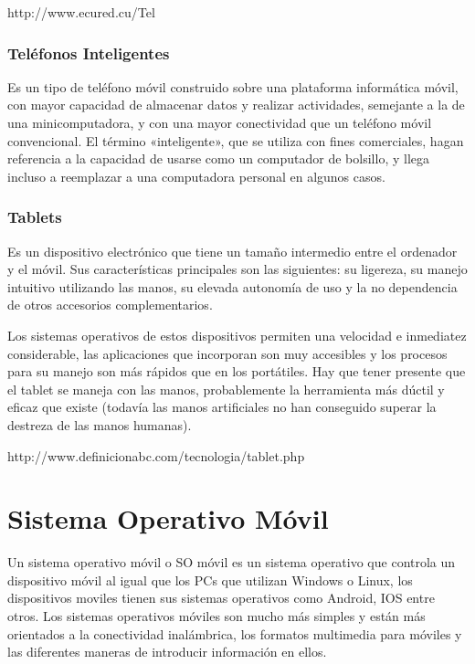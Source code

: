 http://www.ecured.cu/Tel%

\subsubsection{Teléfonos Inteligentes}

Es un tipo de teléfono móvil construido sobre una plataforma informática móvil, con mayor capacidad de almacenar datos y realizar actividades, semejante a la de una minicomputadora, y con una mayor conectividad que un teléfono móvil convencional. El término «inteligente», que se utiliza con fines comerciales, hagan referencia a la capacidad de usarse como un computador de bolsillo, y llega incluso a reemplazar a una computadora personal en algunos casos.

\subsubsection{Tablets}

Es un dispositivo electrónico que tiene un tamaño intermedio entre el ordenador y el móvil. Sus características principales son las siguientes: su ligereza, su manejo intuitivo utilizando las manos, su elevada autonomía de uso y la no dependencia de otros accesorios complementarios.

Los sistemas operativos de estos dispositivos permiten una velocidad e inmediatez considerable, las aplicaciones que incorporan son muy accesibles y los procesos para su manejo son más rápidos que en los portátiles. Hay que tener presente que el tablet se maneja con las manos, probablemente la herramienta más dúctil y eficaz que existe (todavía las manos artificiales no han conseguido superar la destreza de las manos humanas).

http://www.definicionabc.com/tecnologia/tablet.php


\section{Sistema Operativo Móvil}	

Un sistema operativo móvil o SO móvil es un sistema operativo que controla un dispositivo móvil al igual que los PCs que utilizan Windows o Linux, los dispositivos moviles tienen sus sistemas operativos como Android, IOS entre otros. Los sistemas operativos móviles son mucho más simples y están más orientados a la conectividad inalámbrica, los formatos multimedia para móviles y las diferentes maneras de introducir información en ellos.

